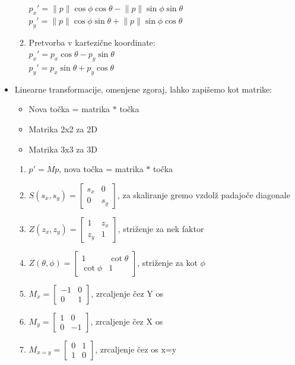 \documentclass{article}
\begin{document}
\begin{itemize}
\begin{enumerate}
        $p_x' = \lVert p \rVert \cos{\phi} \cos{\theta} - \lVert p \rVert \sin{\phi} \sin{\theta}$ \\
        $p_y' = \lVert p \rVert \cos{\phi} \sin{\theta} + \lVert p \rVert \sin{\phi} \cos{\theta}$
        \item Pretvorba v kartezične koordinate: \\
        $p_x' = p_x \cos{\theta} - p_y \sin{\theta}$ \\
        $p_y' = p_x \sin{\theta} + p_y \cos{\theta}$
    \end{enumerate}
    \item Linearne transformacije, omenjene zgoraj, lahko zapišemo kot matrike:
    \begin{itemize}
        \item Nova točka = matrika $*$ točka
        \item Matrika 2x2 za 2D
        \item Matrika 3x3 za 3D
    \end{itemize}
    \begin{enumerate}
        \item $p' = Mp$, nova točka = matrika $*$ točka
        \item $S(s_x, s_y) = \begin{bmatrix} s_x & 0 \\ 0 & s_y \end{bmatrix}$, za skaliranje gremo vzdolž padajoče diagonale
        \item $Z(z_x, z_y) = \begin{bmatrix} 1 & z_x \\ z_y & 1 \end{bmatrix}$, striženje za nek faktor
        \item $Z(\theta, \phi) = \begin{bmatrix} 1 & \cot{\theta} \\ \cot{\phi} & 1 \end{bmatrix}$, striženje za kot $\phi$  
        \item $M_x = \begin{bmatrix} -1 & 0 \\ 0 & 1 \end{bmatrix}$, zrcaljenje čez Y os
        \item $M_y = \begin{bmatrix} 1 & 0 \\ 0 & -1 \end{bmatrix}$, zrcaljenje čez X os
        \item $M_{x=y} = \begin{bmatrix} 0 & 1 \\ 1 & 0 \end{bmatrix}$, zrcaljenje čez os x=y    

\end{enumerate}
\end{itemize}
\end{document}
